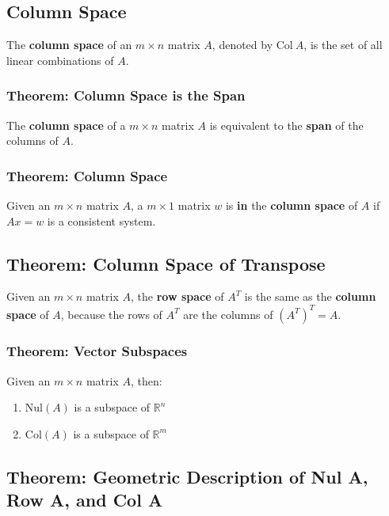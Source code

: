 \documentclass[12pt, letterpaper]{article}
\begin{document}
\subsection*{Column Space}

The \textbf{column space} of an $ m \times n $ matrix $ A $, denoted
by $ \textrm{Col} \: A $, is the set of all linear combinations of $ A $.

\subsubsection*{Theorem: Column Space is the Span}

The \textbf{column space} of a $ m \times n $ matrix $ A $ is
equivalent to the \textbf{span} of the columns of $ A $.

\subsubsection*{Theorem: Column Space}

Given an $ m \times n $ matrix $ A $, a $ m \times 1 $ matrix $ w $
is \textbf{in} the \textbf{column space} of $ A $ if $ Ax = w $ is a
consistent system.

\subsection*{Theorem: Column Space of Transpose}

Given an $ m \times n $ matrix $ A $, the \textbf{row space} of $ A^T
$ is the same as the \textbf{column space} of $ A $, because the rows
of $ A^T $ are the columns of $ (A^T)^T = A $.

\subsubsection*{Theorem: Vector Subspaces}
Given an $ m \times n $ matrix $ A $, then:

\begin{enumerate}
  \item $ \textrm{Nul} (A) $ is a subspace of $ \mathbb{R}^n $
  \item $ \textrm{Col} (A) $ is a subspace of $ \mathbb{R}^m $
\end{enumerate}

\subsection*{Theorem: Geometric Description of Nul A, Row A, and Col A}
\end{document}
